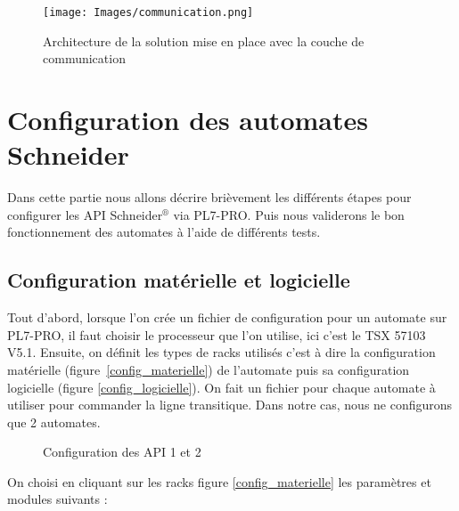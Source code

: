 \documentclass[a4paper,french, titlepage]{book}
\begin{document}
\vspace{2cm}

\begin{figure}[H] 
\begin{center}
\texttt{[image: Images/communication.png]} 
\end{center}
\caption{Architecture de la solution mise en place avec la couche de communication}
\label{com}
\end{figure} 


\newpage
\section{Configuration des automates Schneider}

Dans cette partie nous allons décrire brièvement les différents étapes pour configurer les API Schneider$^{\circledR}$ via PL7-PRO. Puis nous validerons le bon fonctionnement des automates à l'aide de différents tests.
    
\subsection{Configuration matérielle et logicielle}

Tout d'abord, lorsque l'on crée un fichier de configuration pour un automate sur PL7-PRO, il faut choisir le processeur que l'on utilise, ici c'est le TSX 57103 V5.1. Ensuite, on définit les types de racks utilisés c'est à dire la configuration matérielle (figure~\ref{config_materielle}) de l'automate puis sa configuration logicielle (figure \ref{config_logicielle}). On fait un fichier pour chaque automate à utiliser pour commander la ligne transitique. Dans notre cas, nous ne configurons que 2 automates.


\begin{figure}[H] 
  \centering
  \hspace{20pt}
  \caption{Configuration des API 1 et 2}
  \label{config_ap12}
\end{figure}

On choisi en cliquant sur les racks figure \ref{config_materielle} les paramètres et modules suivants : 
\end{document}
